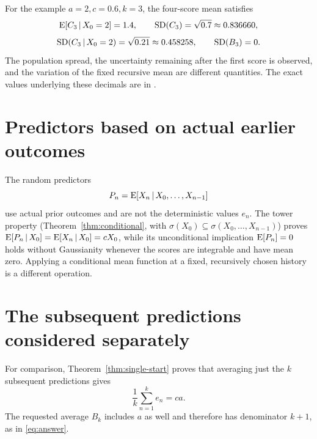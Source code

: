 For the example \(a=2,c=0.6,k=3\), the four-score mean satisfies
\[
  \operatorname{E}[C_3\,\vert\, X_0=2]=1.4,\qquad
  \operatorname{SD}(C_3)=\sqrt{0.7}\approx0.836660,
\]
\[
  \operatorname{SD}(C_3\,\vert\, X_0=2)
    =\sqrt{0.21}\approx0.458258,
  \qquad \operatorname{SD}(B_3)=0.
\]
The population spread, the uncertainty remaining after the first score is
observed, and the variation of the fixed recursive mean are different quantities.
The exact values underlying these decimals are in
.

\section{Predictors based on actual earlier outcomes}
The random predictors
\[
  P_n=\operatorname{E}[X_n\,\vert\, X_0,\ldots,X_{n-1}]
\]
use actual prior outcomes and are not the deterministic values \(e_n\).
The tower property (Theorem~\ref{thm:conditional}, with
\(\sigma(X_0)\subseteq\sigma(X_0,\ldots,X_{n-1})\)) proves
\(\operatorname{E}[P_n\,\vert\, X_0]=\operatorname{E}[X_n\,\vert\, X_0]=cX_0\), while its
unconditional implication \(\operatorname{E}[P_n]=0\) holds without Gaussianity whenever
the scores are integrable and have mean zero. Applying a conditional mean
function at a fixed, recursively chosen history is a different operation.

\section{The subsequent predictions considered separately}
For comparison, Theorem~\ref{thm:single-start} proves that averaging just
the \(k\) subsequent predictions gives
\begin{equation}
  \frac1k\sum_{n=1}^{k}e_n=ca.
  \label{eq:predictions-only}
\end{equation}
The requested average \(B_k\) includes \(a\) as well and therefore has
denominator \(k+1\), as in \eqref{eq:answer}.

